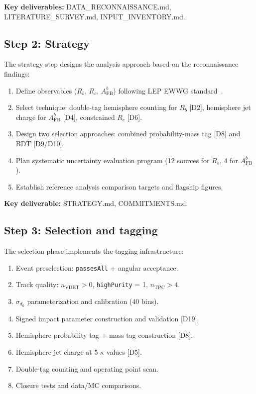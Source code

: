 \documentclass[11pt,a4paper]{article}
\begin{document}
\textbf{Key deliverables:} DATA\_RECONNAISSANCE.md, LITERATURE\_SURVEY.md, INPUT\_INVENTORY.md.

\subsection{Step 2: Strategy}

The strategy step designs the analysis approach based on the reconnaissance findings:
\begin{enumerate}
\item Define observables ($R_b$, $R_c$, $A_\mathrm{FB}^b$) following LEP EWWG
standard~\cite{LEP:EWWG:2005}.
\item Select technique: double-tag hemisphere counting for $R_b$ [D2], hemisphere jet
charge for $A_\mathrm{FB}^b$ [D4], constrained $R_c$ [D6].
\item Design two selection approaches: combined probability-mass tag [D8] and BDT [D9/D10].
\item Plan systematic uncertainty evaluation program (12 sources for $R_b$, 4 for $A_\mathrm{FB}^b$).
\item Establish reference analysis comparison targets and flagship figures.
\end{enumerate}

\textbf{Key deliverable:} STRATEGY.md, COMMITMENTS.md.

\subsection{Step 3: Selection and tagging}

The selection phase implements the tagging infrastructure:
\begin{enumerate}
\item Event preselection: \texttt{passesAll} + angular acceptance.
\item Track quality: $n_\mathrm{VDET} > 0$, \texttt{highPurity} = 1, $n_\mathrm{TPC} > 4$.
\item $\sigma_{d_0}$ parameterization and calibration (40 bins).
\item Signed impact parameter construction and validation [D19].
\item Hemisphere probability tag + mass tag construction [D8].
\item Hemisphere jet charge at 5 $\kappa$ values [D5].
\item Double-tag counting and operating point scan.
\item Closure tests and data/MC comparisons.
\end{enumerate}
\end{document}
